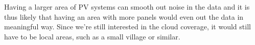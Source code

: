 
Having a larger area of PV systems can smooth out noise in the data
\citep{cloudsAndPower} and it is thus likely that having an area with
more panels would even out the data in meaningful way.  Since we're
still interested in the cloud coverage, it would still have to be
local areas, such as a small village or similar.

